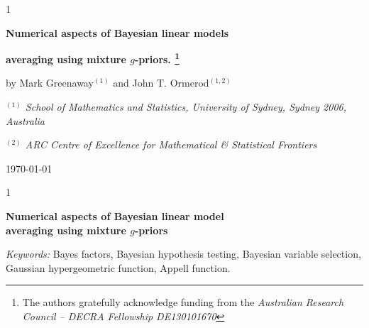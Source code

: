 \documentclass[12pt]{article}
\newcommand{\blind}{1}
\begin{document}
	
	\def\spacingset#1{\renewcommand{\baselinestretch}%
		{#1}\small\normalsize} \spacingset{1}	
	
	
	\blind
	{
		\centerline{\bf \Large Numerical aspects of Bayesian linear models}
		\medskip
		\centerline{\bf \Large averaging
			using mixture $g$-priors. \footnote{ 
				The authors gratefully acknowledge funding from the \textit{Australian Research Council -- DECRA Fellowship  DE130101670}}}
		
		\medskip
		\medskip
		\centerline{\sc by Mark Greenaway${}^{(1)}$ and 
			John T. Ormerod${}^{(1,2)}$}
		\medskip
		\centerline{\it ${}^{(1)}$ School of Mathematics and Statistics, University of Sydney, Sydney 2006, Australia}
		\medskip
		\centerline{\it ${}^{(2)}$ ARC Centre of Excellence for Mathematical \& Statistical Frontiers}
		
		\medskip
		\centerline{\today}
	}	
	
	
	\fi
	
	\blind
	{
		\bigskip
		\bigskip
		\bigskip
		\begin{center}
			{\LARGE\bf Numerical aspects of Bayesian linear model \\ averaging
				using mixture $g$-priors}
		\end{center}
		\medskip
	} \fi
	
	\bigskip
	\begin{abstract}
We consider the numerical evaluation of Bayes factors for linear models using different mixture 
$g$-priors. In particular we consider hyperpriors for $g$ leading to closed form expressions for the Bayes factor including  the hyper-$g$ and 
hyper-$g/n$ priors of \cite{Liang2008}, the beta-prime prior of \cite{Maruyama2011}, the robust 
prior of \cite{Bayarri2012}, and the cake prior of \cite{OrmerodEtal2017}. In particular we 
describe how each of these Bayes factor, except for Bayes factor under the hyper-$g/n$ prior, can
evaluated in efficient, accurate and numerically stable manner. We also derive a closed form 
expression for the Bayes factor under the hyper-$g/n$ for which we develop a convenient numerical 
approximation. 
We implement an {\tt R} package for Bayesian linear model averaging,
and discuss some associated computational issues. We illustrate the advantages of our implementation 
over several existing packages on several small datasets.
	\end{abstract}
	
	\noindent%
	{\it Keywords:} Bayes factors, Bayesian hypothesis testing, Bayesian variable selection,
	Gaussian hypergeometric function, Appell function. 
	\vfill
	
\end{document}
